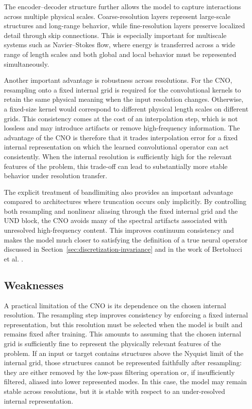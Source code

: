 The encoder--decoder structure further allows the model to capture interactions across multiple physical scales. Coarse-resolution layers represent large-scale structures and long-range behavior, while fine-resolution layers preserve localized detail through skip connections. This is especially important for multiscale systems such as Navier--Stokes flow, where energy is transferred across a wide range of length scales and both global and local behavior must be represented simultaneously.

Another important advantage is robustness across resolutions. For the CNO, resampling onto a fixed internal grid is required for the convolutional kernels to retain the same physical meaning when the input resolution changes. Otherwise, a fixed-size kernel would correspond to different physical length scales on different grids. This consistency comes at the cost of an interpolation step, which is not lossless and may introduce artifacts or remove high-frequency information. The advantage of the CNO is therefore that it trades interpolation error for a fixed internal representation on which the learned convolutional operator can act consistently. When the internal resolution is sufficiently high for the relevant features of the problem, this trade-off can lead to substantially more stable behavior under resolution transfer.

The explicit treatment of bandlimiting also provides an important advantage compared to architectures where truncation occurs only implicitly. By controlling both resampling and nonlinear aliasing through the fixed internal grid and the UND block, the CNO avoids many of the spectral artifacts associated with unresolved high-frequency content. This improves continuum consistency and makes the model much closer to satisfying the definition of a true neural operator discussed in Section~\ref{sec:discretization-invariance} and in the work of Bertolucci et al. \cite{bartolucci-discretization-invariance}.

\subsection{Weaknesses}

A practical limitation of the CNO is its dependence on the chosen internal resolution. The resampling step improves consistency by enforcing a fixed internal representation, but this resolution must be selected when the model is built and remains fixed after training. This amounts to assuming that the chosen internal grid is sufficiently fine to represent the physically relevant features of the problem. If an input or target contains structures above the Nyquist limit of the internal grid, those structures cannot be represented faithfully after resampling: they are either removed by the low-pass filtering operation or, if insufficiently filtered, aliased into lower represented modes. In this case, the model may remain stable across resolutions, but it is stable with respect to an under-resolved internal representation.

